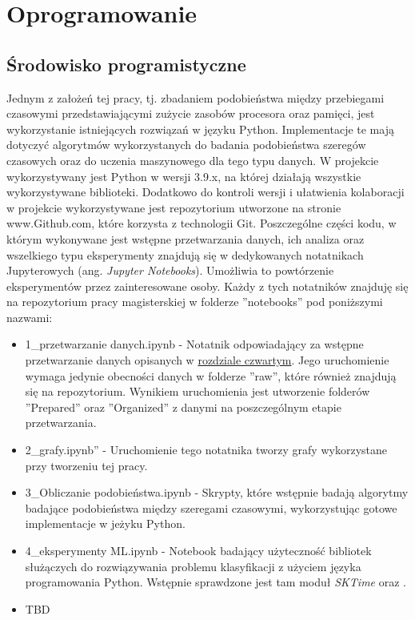 \chapter{Oprogramowanie}
\section{Środowisko programistyczne}
    Jednym z założeń tej pracy, tj. zbadaniem podobieństwa między przebiegami czasowymi przedstawiającymi zużycie zasobów procesora oraz pamięci, jest wykorzystanie istniejących rozwiązań w języku Python. Implementacje te mają dotyczyć algorytmów wykorzystanych do badania podobieństwa szeregów czasowych oraz do uczenia maszynowego dla tego typu danych. W projekcie wykorzystywany jest Python w wersji 3.9.x, na której działają wszystkie wykorzystywane biblioteki. Dodatkowo do kontroli wersji i ułatwienia kolaboracji w projekcie wykorzystywane jest repozytorium utworzone na stronie www.Github.com, które korzysta z technologii Git.
    Poszczególne części kodu, w którym wykonywane jest wstępne przetwarzania danych, ich analiza oraz wszelkiego typu eksperymenty znajdują się w dedykowanych notatnikach Jupyterowych (ang. \textit{Jupyter Notebooks}). Umożliwia to powtórzenie eksperymentów przez zainteresowane osoby. Każdy z tych notatników znajduję się na repozytorium pracy magisterskiej \cite{Repozytorium} w folderze ''notebooks'' pod poniższymi nazwami:
    \begin{itemize}
        \item 1\_przetwarzanie danych.ipynb - Notatnik odpowiadający za wstępne przetwarzanie danych opisanych w \hyperref[chap:opisdanych]{rozdziale czwartym}. Jego uruchomienie wymaga jedynie obecności danych w folderze ''raw'', które również znajdują się na repozytorium. Wynikiem uruchomienia jest utworzenie folderów ''Prepared'' oraz ''Organized'' z danymi na poszczególnym etapie przetwarzania.
        \item 2\_grafy.ipynb'' - Uruchomienie tego notatnika tworzy grafy wykorzystane przy tworzeniu tej pracy.
        \item 3\_Obliczanie podobieństwa.ipynb - Skrypty, które wstępnie badają algorytmy badające podobieństwa między szeregami czasowymi, wykorzystując gotowe implementacje w jeżyku Python.
        \item 4\_eksperymenty ML.ipynb - Notebook badający użyteczność bibliotek służączych do rozwiązywania problemu klasyfikacji z użyciem języka programowania Python. Wstępnie sprawdzone jest tam moduł \textit{SKTime} oraz .
        \item TBD
    \end{itemize}
    
